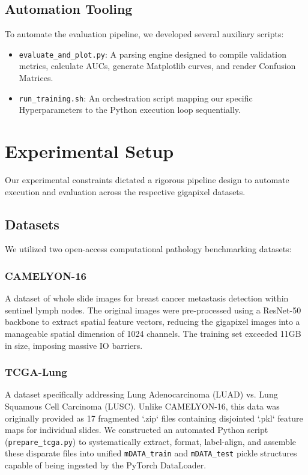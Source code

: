 \documentclass[11pt,a4paper]{article}
\begin{document}
\subsection{Automation Tooling}
To automate the evaluation pipeline, we developed several auxiliary scripts:
\begin{itemize}
    \item \texttt{evaluate\_and\_plot.py}: A parsing engine designed to compile validation metrics, calculate AUCs, generate Matplotlib curves, and render Confusion Matrices.
    \item \texttt{run\_training.sh}: An orchestration script mapping our specific Hyperparameters to the Python execution loop sequentially.
\end{itemize}

\section{Experimental Setup}
Our experimental constraints dictated a rigorous pipeline design to automate execution and evaluation across the respective gigapixel datasets.

\subsection{Datasets}
We utilized two open-access computational pathology benchmarking datasets:

\subsubsection{CAMELYON-16}
A dataset of whole slide images for breast cancer metastasis detection within sentinel lymph nodes. The original images were pre-processed using a ResNet-50 backbone to extract spatial feature vectors, reducing the gigapixel images into a manageable spatial dimension of 1024 channels. The training set exceeded 11GB in size, imposing massive IO barriers.

\subsubsection{TCGA-Lung}
A dataset specifically addressing Lung Adenocarcinoma (LUAD) vs. Lung Squamous Cell Carcinoma (LUSC). Unlike CAMELYON-16, this data was originally provided as 17 fragmented `.zip` files containing disjointed `.pkl` feature maps for individual slides. We constructed an automated Python script (\texttt{prepare\_tcga.py}) to systematically extract, format, label-align, and assemble these disparate files into unified \texttt{mDATA\_train} and \texttt{mDATA\_test} pickle structures capable of being ingested by the PyTorch DataLoader.
\end{document}
